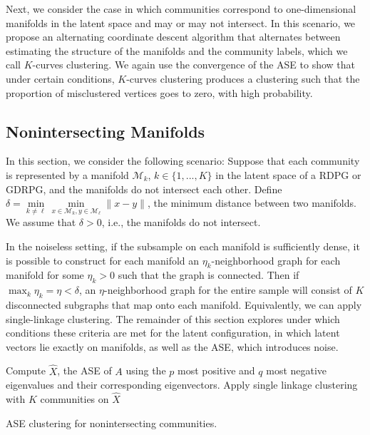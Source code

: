 \documentclass[12pt]{article}
\begin{document}
Next, we consider the case in which communities correspond to
one-dimensional manifolds in the latent space and may or may not
intersect. In this scenario, we propose an alternating coordinate
descent algorithm that alternates between estimating the structure of
the manifolds and the community labels, which we call \(K\)-curves
clustering. We again use the convergence of the ASE to show that under
certain conditions, \(K\)-curves clustering produces a clustering such
that the proportion of misclustered vertices goes to zero, with high
probability.

\hypertarget{nonintersecting-manifolds}{%
\subsection{Nonintersecting Manifolds}\label{nonintersecting-manifolds}}

\label{section:nonintersecting}

In this section, we consider the following scenario: Suppose that each
community is represented by a manifold \(\mathcal{M}_k\),
\(k \in \{1, ..., K\}\) in the latent space of a RDPG or GDRPG, and the
manifolds do not intersect each other. Define
\(\delta = \min\limits_{k \neq \ell} \min\limits_{x \in \mathcal{M}_k, y \in \mathcal{M}_\ell} \|x - y\|\),
the minimum distance between two manifolds. We assume that
\(\delta > 0\), i.e., the manifolds do not intersect.

In the noiseless setting, if the subsample on each manifold is
sufficiently dense, it is possible to construct for each manifold an
\(\eta_k\)-neighborhood graph for each manifold for some \(\eta_k > 0\)
such that the graph is connected. Then if
\(\max_k \eta_k = \eta < \delta\), an \(\eta\)-neighborhood graph for
the entire sample will consist of \(K\) disconnected subgraphs that map
onto each manifold. Equivalently, we can apply single-linkage
clustering. The remainder of this section explores under which
conditions these criteria are met for the latent configuration, in which
latent vectors lie exactly on manifolds, as well as the ASE, which
introduces noise.

\begin{algorithm}[h]
\DontPrintSemicolon
\SetAlgoLined
{}
Compute $\hat{X}$, the ASE of $A$ using the $p$ most positive and $q$ most negative eigenvalues and their corresponding eigenvectors.\;
Apply single linkage clustering with $K$ communities on $\hat{X}$\;
\caption{ASE clustering for nonintersecting communities.}
\end{algorithm}
\end{document}
